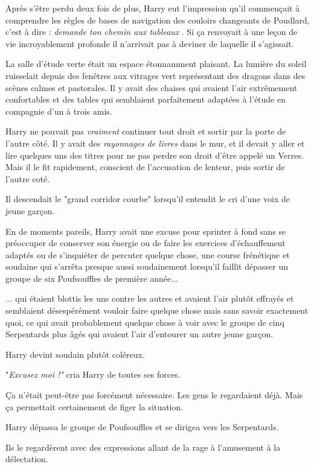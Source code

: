 Après s'être perdu deux fois de plus, Harry eut l'impression qu'il commençait à comprendre les règles de bases de navigation des couloirs changeants de Poudlard, c'est à dire : \emph{demande ton chemin aux tableaux} . Si ça renvoyait à une leçon de vie incroyablement profonde il n'arrivait pas à deviner de laquelle il s'agissait.

La salle d'étude verte était un espace étonnamment plaisant. La lumière du soleil ruisselait depuis des fenêtres aux vitrages vert représentant des dragons dans des scènes calmes et pastorales. Il y avait des chaises qui avaient l'air extrêmement confortables et des tables qui semblaient parfaitement adaptées à l'étude en compagnie d'un à trois amis.

Harry ne pouvait pas \emph{vraiment } continuer tout droit et sortir par la porte de l'autre côté. Il y avait des \emph{rayonnages de livres}  dans le mur, et il devait y aller et lire quelques uns des titres pour ne pas perdre son droit d'être appelé un Verres. Mais il le fit rapidement, conscient de l'accusation de lenteur, puis sortir de l'autre coté.

Il descendait le "grand corridor courbe" lorsqu'il entendit le cri d'une voix de jeune garçon.

En de moments pareils, Harry avait une excuse pour sprinter à fond sans se préoccuper de conserver son énergie ou de faire les exercices d'échauffement adaptés ou de s'inquiéter de percuter quelque chose, une course frénétique et soudaine qui s'arrêta presque aussi soudainement lorsqu'il faillit dépasser un groupe de six Poufsouffles de première année...

... qui étaient blottis les uns contre les autres et avaient l'air plutôt effrayés et semblaient désespérément vouloir faire quelque chose mais sans savoir exactement quoi, ce qui avait probablement quelque chose à voir avec le groupe de cinq Serpentards plus âgés qui avaient l'air d'entourer un autre jeune garçon.

Harry devint soudain plutôt coléreux.

"\emph{Excusez moi !"}  cria Harry de toutes ses forces.

Ça n'était peut-être pas forcément nécessaire. Les gens le regardaient déjà. Mais ça permettait certainement de figer la situation.

Harry dépassa le groupe de Poufsouffles et se dirigea vers les Serpentards.

Ils le regardèrent avec des expressions allant de la rage à l'amusement à la délectation.

